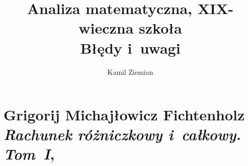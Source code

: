 \documentclass[a4paper,11pt]{article}
\title{Analiza matematyczna, XIX-wieczna szkoła \\
  {\Large Błędy i~uwagi}}
\author{Kamil Ziemian}
\numberwithin{equation}{section}
\begin{document}





\maketitle






\section{Grigorij Michajłowicz Fichtenholz
  \textit{Rachunek różniczkowy i~całkowy. Tom~I},
  \parencite{Fichtenholz-Rachunek-rozniczkowy-ETC-Vol-I-Pub-2005}}

\vspace{0em}



\vspace{0em}




\VerSpaceFour




\newpage

\end{document}
